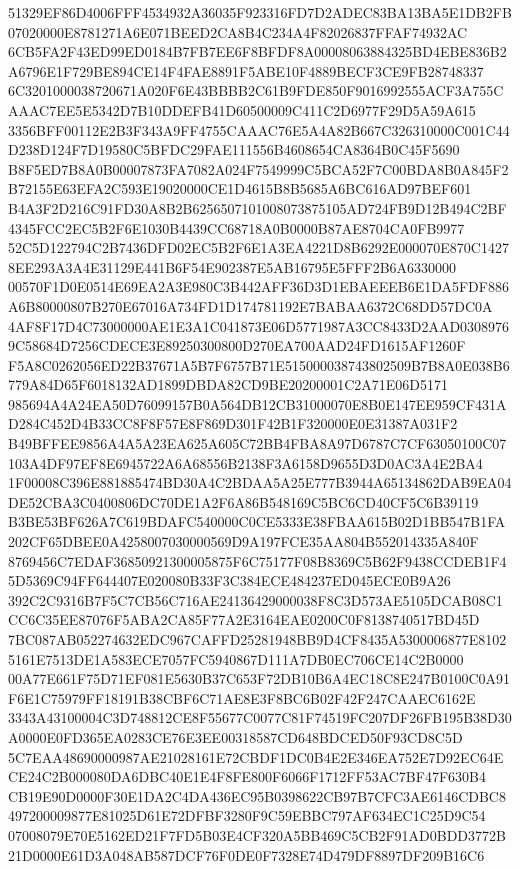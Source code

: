 \documentclass[UTF8,fontset=fandol,zihao=-4,a4paper]{ctexart}
\begin{document}
{{51329EF86D4006FFF4534932A36035F923316FD7D2ADEC83BA13BA5E1DB2FB07020000E8781271A6E071BEED2CA8B4C234A4F82026837FFAF74932AC
6CB5FA2F43ED99ED0184B7FB7EE6F8BFDF8A00008063884325BD4EBE836B2A6796E1F729BE894CE14F4FAE8891F5ABE10F4889BECF3CE9FB28748337
6C3201000038720671A020F6E43BBBB2C61B9FDE850F9016992555ACF3A755CAAAC7EE5E5342D7B10DDEFB41D60500009C411C2D6977F29D5A59A615
3356BFF00112E2B3F343A9FF4755CAAAC76E5A4A82B667C326310000C001C44D238D124F7D19580C5BFDC29FAE111556B4608654CA8364B0C45F5690
B8F5ED7B8A0B00007873FA7082A024F7549999C5BCA52F7C00BDA8B0A845F2B72155E63EFA2C593E19020000CE1D4615B8B5685A6BC616AD97BEF601
B4A3F2D216C91FD30A8B2B6256507101008073875105AD724FB9D12B494C2BF4345FCC2EC5B2F6E1030B4439CC68718A0B0000B87AE8704CA0FB9977
52C5D122794C2B7436DFD02EC5B2F6E1A3EA4221D8B6292E000070E870C14278EE293A3A4E31129E441B6F54E902387E5AB16795E5FFF2B6A6330000
00570F1D0E0514E69EA2A3E980C3B442AFF36D3D1EBAEEEB6E1DA5FDF886A6B80000807B270E67016A734FD1D174781192E7BABAA6372C68DD57DC0A
4AF8F17D4C73000000AE1E3A1C041873E06D5771987A3CC8433D2AAD03089769C58684D7256CDECE3E89250300800D270EA700AAD24FD1615AF1260F
F5A8C0262056ED22B37671A5B7F6757B71E515000038743802509B7B8A0E038B6779A84D65F6018132AD1899DBDA82CD9BE20200001C2A71E06D5171
985694A4A24EA50D76099157B0A564DB12CB31000070E8B0E147EE959CF431AD284C452D4B33CC8F8F57E8F869D301F42B1F320000E0E31387A031F2
B49BFFEE9856A4A5A23EA625A605C72BB4FBA8A97D6787C7CF63050100C07103A4DF97EF8E6945722A6A68556B2138F3A6158D9655D3D0AC3A4E2BA4
1F00008C396E881885474BD30A4C2BDAA5A25E777B3944A65134862DAB9EA04DE52CBA3C0400806DC70DE1A2F6A86B548169C5BC6CD40CF5C6B39119
B3BE53BF626A7C619BDAFC540000C0CE5333E38FBAA615B02D1BB547B1FA202CF65DBEE0A4258007030000569D9A197FCE35AA804B552014335A840F
8769456C7EDAF36850921300005875F6C75177F08B8369C5B62F9438CCDEB1F45D5369C94FF644407E020080B33F3C384ECE484237ED045ECE0B9A26
392C2C9316B7F5C7CB56C716AE24136429000038F8C3D573AE5105DCAB08C1CC6C35EE87076F5ABA2CA85F77A2E3164EAE0200C0F8138740517BD45D
7BC087AB052274632EDC967CAFFD25281948BB9D4CF8435A5300006877E81025161E7513DE1A583ECE7057FC5940867D111A7DB0EC706CE14C2B0000
00A77E661F75D71EF081E5630B37C653F72DB10B6A4EC18C8E247B0100C0A91F6E1C75979FF18191B38CBF6C71AE8E3F8BC6B02F42F247CAAEC6162E
3343A43100004C3D748812CE8F55677C0077C81F74519FC207DF26FB195B38D30A0000E0FD365EA0283CE76E3EE00318587CD648BDCED50F93CD8C5D
5C7EAA48690000987AE21028161E72CBDF1DC0B4E2E346EA752E7D92EC64ECE24C2B000080DA6DBC40E1E4F8FE800F6066F1712FF53AC7BF47F630B4
CB19E90D0000F30E1DA2C4DA436EC95B0398622CB97B7CFC3AE6146CDBC8497200009877E81025D61E72DFBF3280F9C59EBBC797AF634EC1C25D9C54
07008079E70E5162ED21F7FD5B03E4CF320A5BB469C5CB2F91AD0BDD3772B21D0000E61D3A048AB587DCF76F0DE0F7328E74D479DF8897DF209B16C6
}}
\end{document}
